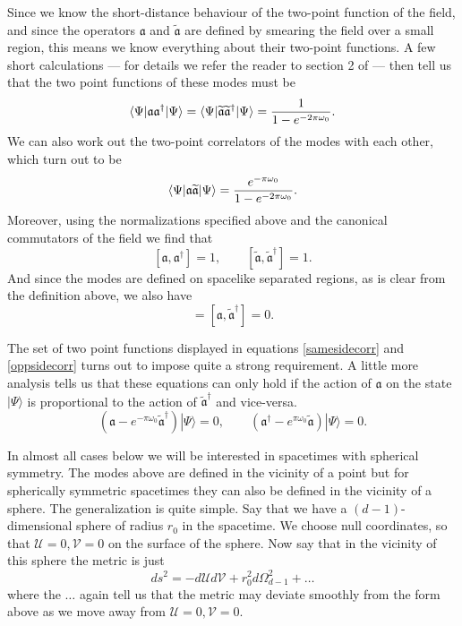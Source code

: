 \documentclass[12pt]{article}
\newcommand{\be}{\begin{equation}}
\newcommand{\ee}{\end{equation}}
\def \anh {\mathfrak{a}}
\def \tildanh {\widetilde{\mathfrak{a}}}
\def\uent{\mathcal{U}}
\def\vent{\mathcal{V}}
\begin{document}
Since we know the short-distance behaviour of the two-point function of the field, and since the operators $\anh$ and $\tildanh$ are defined by smearing the field over a small region, this means we know everything about their two-point functions. A few short calculations --- for details we refer the reader to section 2 of \cite{Papadodimas:2019msp}--- then tell us that the two point functions of these modes must be
\be 
\label{samesidecorr}
\langle \Psi | \anh \anh^{\dagger} | \Psi \rangle = \langle \Psi | \tildanh \tildanh^{\dagger} | \Psi \rangle = {1 \over 1 - e^{-2 \pi \omega_0}}.
\ee
We can also work out the two-point correlators of the modes with each other, which turn out to be
\be
\label{oppsidecorr}
\langle \Psi | \anh \tildanh | \Psi \rangle = {e^{-\pi \omega_0}  \over 1 - e^{-2 \pi \omega_0}}.
\ee
Moreover, using the normalizations specified above and the canonical commutators of the field we find that
\be
\label{commutmodes}
[\anh, \anh^{\dagger}] = 1, \qquad
[\tildanh, \tildanh^{\dagger}] = 1.
\ee
And since the modes are defined on spacelike separated regions, as is clear from the definition above, we also have
\be
[\anh, \tildanh] =[\anh, \tildanh^{\dagger}] = 0.
\ee

The set of two point functions displayed in equations \eqref{samesidecorr} and \eqref{oppsidecorr} turns out to impose quite a strong requirement.  A little more analysis tells us that these equations can only hold if the action of $\anh$ on the state $|\Psi \rangle$ is proportional to the action of $\tildanh^{\dagger}$ and vice-versa. 
\be
\label{stateaction}
(\anh - e^{-\pi \omega_0} \tildanh^{\dagger})|\Psi \rangle = 0, \qquad
(\anh^{\dagger} - e^{{\pi \omega_0}} \tildanh)  |\Psi \rangle = 0. 
\ee


In almost all cases below we will be interested in spacetimes with spherical symmetry. The modes above are defined in the vicinity of a point but for spherically symmetric spacetimes they can also be defined in the vicinity of a sphere. The generalization is quite simple.
Say that we have a $(d-1)$-dimensional sphere of radius $r_0$ in the spacetime. We choose null coordinates, so that  $\uent=0, \vent = 0$ on the surface of the sphere.  Now say that in the vicinity of this sphere the metric is just
\be
\label{metricsphericalnull}
ds^2 = -d \uent d \vent + r_0^2 d \Omega_{d-1}^2 + \ldots
\ee
where the $\ldots$ again tell us that the metric may deviate smoothly from the form above as we move away from $\uent = 0, \vent = 0$. 
\end{document}
